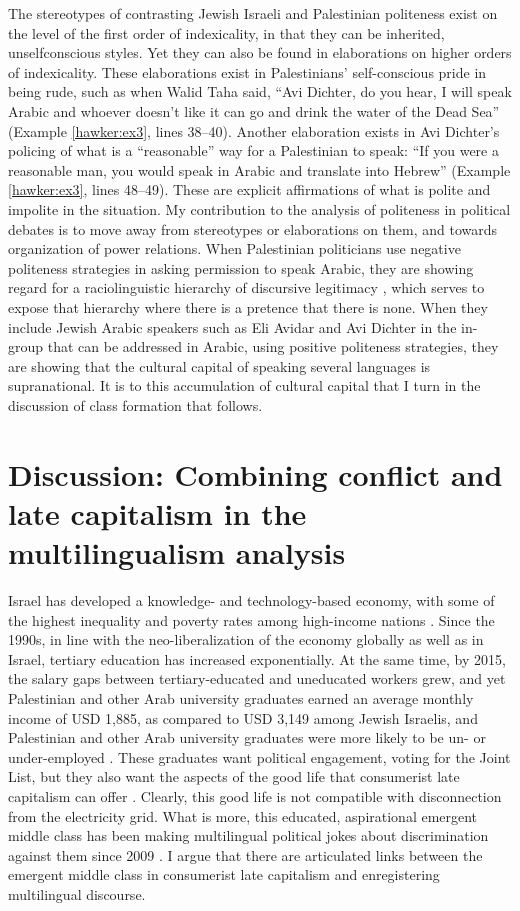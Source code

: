 \documentclass[output=paper,arabicfont]{langscibook}
\begin{document}
The stereotypes of contrasting Jewish Israeli and Palestinian politeness exist on the level of the first order of indexicality, in that they can be inherited, unselfconscious styles. Yet they can also be found in elaborations on higher orders of indexicality. These elaborations exist in Palestinians’ self-conscious pride in being rude, such as when Walid Taha said, “Avi Dichter, do you hear, I will speak Arabic and whoever doesn’t like it can go and drink the water of the Dead Sea” (Example \ref{hawker:ex3}, lines 38–40). Another elaboration exists in Avi Dichter’s policing of what is a “reasonable” way for a Palestinian to speak: “If you were a reasonable man, you would speak in Arabic and translate into Hebrew” (Example \ref{hawker:ex3}, lines 48–49). These are explicit affirmations of what is polite and impolite in the situation. My contribution to the analysis of politeness in political debates is to move away from stereotypes or elaborations on them, and towards organization of power relations. When Palestinian politicians use negative politeness strategies in asking permission to speak Arabic, they are showing regard for a raciolinguistic hierarchy of discursive legitimacy \citep[251]{heller2017a}, which serves to expose that hierarchy where there is a pretence that there is none. When they include Jewish Arabic speakers such as Eli Avidar and Avi Dichter in the in-group that can be addressed in Arabic, using positive politeness strategies, they are showing that the cultural capital of speaking several languages is supranational. It is to this accumulation of cultural capital that I turn in the discussion of class formation that follows.

\section{Discussion: Combining conflict and late capitalism in the multilingualism analysis}

Israel has developed a knowledge- and technology-based economy, with some of the highest inequality and poverty rates among high-income nations \citep{o2021a}. Since the 1990s, in line with the neo-liberalization of the economy globally as well as in Israel, tertiary education has increased exponentially. At the same time, by 2015, the salary gaps between tertiary-educated and uneducated workers grew, and yet Palestinian and other Arab university graduates earned an average monthly income of USD 1,885, as compared to USD 3,149 among Jewish Israelis, and Palestinian and other Arab university graduates were more likely to be un- or under-employed \citep{ayalon2016a}. These graduates want political engagement, voting for the Joint List, but they also want the aspects of the good life that consumerist late capitalism can offer \citep{carmeli2004a}. Clearly, this good life is not compatible with disconnection from the electricity grid. What is more, this educated, aspirational emergent middle class has been making multilingual political jokes about discrimination against them since 2009 \citep{henkin2009a}. I argue that there are articulated links between the emergent middle class in consumerist late capitalism and enregistering multilingual discourse.
\end{document}
